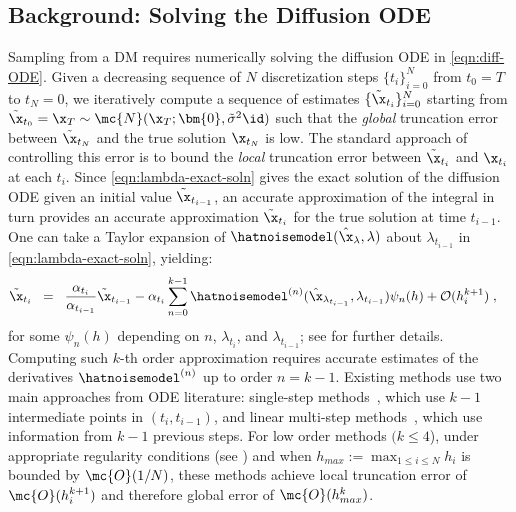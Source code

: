 \subsection{Background: Solving the Diffusion ODE}\label{sec:background-diff-ode}
Sampling from a DM requires numerically solving the diffusion ODE in \eqref{eqn:diff-ODE}.
Given a decreasing sequence of $N$ discretization steps $\{t_i\}_{i=0}^N$ from $t_0=T$ to $t_N=0$, we iteratively compute a sequence of estimates $\{\tilde \x_{t_i}\}_{i=0}^N$ starting from $\tilde \x_{t_0}=\x_T\sim \mc{N}(\x_T;\bm{0}, \tilde\sigma^2\id)$ such that the \emph{global} truncation error between $\tilde \x_{t_N}$ and the true solution $\x_{t_N}$ is low.
The standard approach of controlling this error is to bound the \emph{local} truncation error between $\tilde \x_{t_i}$ and $\x_{t_i}$ at each $t_i$.
Since \eqref{eqn:lambda-exact-soln} gives the exact solution of the diffusion ODE given an initial value $\tilde\x_{t_{i-1}}$, an accurate approximation of the integral in turn provides an accurate approximation $\tilde \x_{t_i}$ for the true solution at time $t_{i-1}$.
One can take a Taylor expansion of $\hatnoisemodel(\hat\x_\lambda,\lambda)$ about $\lambda_{t_{i-1}}$ in \eqref{eqn:lambda-exact-soln}, yielding:
\begin{align}
\tilde\x_{t_i} \;\; = \;\; \frac{\alpha_{t_i}}{\alpha_{t_{i-1}}} \tilde{\x}_{t_{i-1}} 
   - \alpha_{t_i} \sum_{n=0}^{k-1} \hatnoisemodel^{(n)}(&\hat{\x}_{\lambda_{t_{i-1}}}, \lambda_{t_{i-1}}) \psi_n(h)  
   + \mathcal{O}(h_i^{k+1})\;, \label{eqn:lambda-taylor-soln}
\end{align}
for some $\psi_n(h)$ depending on $n$, $\lambda_{t_i}$, and $\lambda_{t_{i-1}}$; see  for further details.
Computing such $k$-th order approximation requires accurate estimates of the derivatives $\hatnoisemodel^{(n)}$ up to order $n=k-1$. 
Existing methods use two main approaches from ODE literature: single-step methods~\citep{lu2022dpm, lu2022dpmpp, zheng2023dpm, zhao2023unipc, zhang2022fast, karras2022elucidating}, which use $k-1$ intermediate points in $(t_i, t_{i-1})$, and linear multi-step methods~\citep{lu2022dpmpp,zheng2023dpm,zhao2023unipc,zhang2022fast,liu2022pseudo}, which use information from $k-1$ previous steps. 
For low order methods $(k\leq 4$), under appropriate regularity conditions (see ) and when $h_{max}:=\max_{1\leq i\leq N} h_i$ is bounded by $\mc{O}(1/N)$, these methods achieve local truncation error of $\mc{O}(h_i^{k+1})$ and therefore global error of $\mc{O}(h_{max}^k)$.

